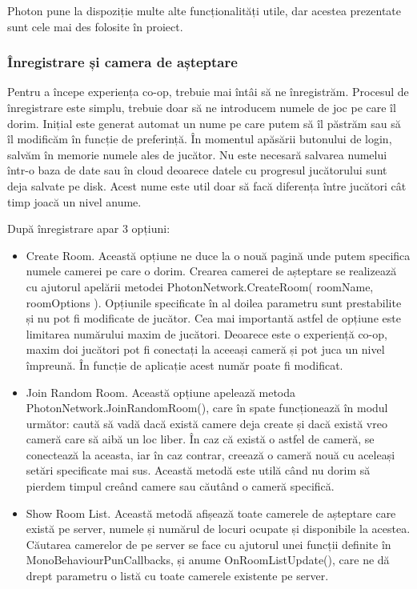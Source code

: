 \documentclass[12pt, a4paper]{article}
\begin{document}
	Photon pune la dispoziție multe alte funcționalități utile, dar acestea prezentate sunt cele mai des folosite în proiect.
	
	
	
	
	
	\subsubsection{Înregistrare și camera de așteptare}
	
	Pentru a începe experiența co-op, trebuie mai întâi să ne înregistrăm. Procesul de înregistrare este simplu, trebuie doar să ne introducem numele de joc pe care îl dorim. Inițial este generat automat un nume pe care putem să îl păstrăm sau să îl modificăm în funcție de preferință. În momentul apăsării butonului de login, salvăm în memorie numele ales de jucător. Nu este necesară salvarea numelui într-o baza de date sau în cloud deoarece datele cu progresul jucătorului sunt deja salvate pe disk. Acest nume este util doar să facă diferența între jucători cât timp joacă un nivel anume.
	\newline
	
	După înregistrare apar 3 opțiuni:
	
	\begin{itemize}
		\item Create Room. Această opțiune ne duce la o nouă pagină unde putem specifica numele camerei pe care o dorim. Crearea camerei de așteptare se realizează cu ajutorul apelării metodei PhotonNetwork.CreateRoom( roomName, roomOptions ). Opțiunile specificate în al doilea parametru sunt prestabilite și nu pot fi modificate de jucător. Cea mai importantă astfel de opțiune este limitarea numărului maxim de jucători. Deoarece este o experiență co-op, maxim doi jucători pot fi conectați la aceeași cameră și pot juca un nivel împreună. În funcție de aplicație acest număr poate fi modificat.
		\item Join Random Room. Această opțiune apelează metoda PhotonNetwork.JoinRandomRoom(), care în spate funcționează în modul următor: caută să vadă dacă există camere deja create și dacă există vreo cameră care să aibă un loc liber. În caz că există o astfel de cameră, se conectează la aceasta, iar în caz contrar, creează o cameră nouă cu aceleași setări specificate mai sus. Această metodă este utilă când nu dorim să pierdem timpul creând camere sau căutând o cameră specifică.
		\item Show Room List. Această metodă afișează toate camerele de așteptare care există pe server, numele și numărul de locuri ocupate și disponibile la acestea. Căutarea camerelor de pe server se face cu ajutorul unei funcții definite în MonoBehaviourPunCallbacks, și anume OnRoomListUpdate(), care ne dă drept parametru o listă cu toate camerele existente pe server.
	\end{itemize}
	
\end{document}
